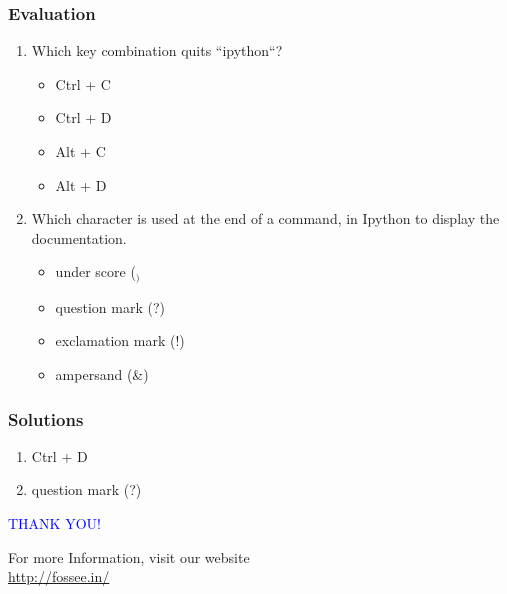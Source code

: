 \documentclass[presentation]{beamer}
\begin{document}
\begin{frame}
\frametitle{Evaluation}
\label{sec-9}



\begin{enumerate}
\item Which key combination quits ``ipython``?
\begin{itemize}
\item Ctrl + C
\item Ctrl + D
\item Alt + C
\item Alt + D
\end{itemize}
\item Which character is used at the end of a command, in Ipython to
     display the documentation.
\begin{itemize}
\item under score ($_)$
\item question mark (?)
\item exclamation mark (!)
\item ampersand (\&)
\end{itemize}
\end{enumerate}
\end{frame}
\begin{frame}
\frametitle{Solutions}
\label{sec-10}

    

\begin{enumerate}
\item Ctrl + D
\item question mark (?)
\end{enumerate}
\end{frame}
\begin{frame}

  \begin{block}{}
  \begin{center}
  \textcolor{blue}{\Large THANK YOU!} 
  \end{center}
  \end{block}
\begin{block}{}
  \begin{center}
    For more Information, visit our website\\
    \url{http://fossee.in/}
  \end{center}  
  \end{block}
\end{frame}
\end{document}
